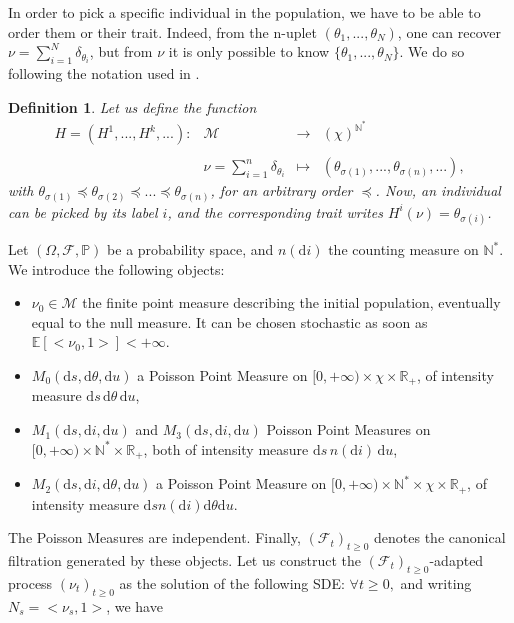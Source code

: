 \documentclass[a4paper,11pt]{article}
\newtheorem{defi}[theo]{Definition}
\newcommand{\itemb}{\item[$\bullet$]}
\newcommand{\dx}{\textrm{d}}
\begin{document}
In order to pick a specific individual in the population, we have to be able to order them or their trait. Indeed, from the n-uplet $(\theta_1,...,\theta_N)$, one can recover $\nu = \sum_{i=1}^N \delta_{\theta_i}$, but from $\nu$ it is only possible to know $\{\theta_1,...,\theta_N\}$. We do so following the notation used in \cite{fournier_microscopic_2004}.


\begin{defi}\label{notation}
Let us define the function 
\begin{displaymath}
\begin{array}{lccl}
H=(H^{1},...,H^{k},...) : & \mathcal{M} & \longrightarrow & \left(\chi\right)^{\mathbb{N}^{*}} \\
&&&\\
    &\displaystyle \nu = \sum_{i=1}^{n} \delta_{\theta_{i}} & \longmapsto & (\theta_{\sigma(1)},...,\theta_{\sigma(n)},... ), 
\end{array}
\end{displaymath}
with $\theta_{\sigma(1)} \preceq \theta_{\sigma(2)}\preceq ... \preceq \theta_{\sigma(n)}$, for an arbitrary order $\preceq$. 
Now, an individual can be picked by its label $i$, and the corresponding trait writes $H^{i}(\nu) = \theta_{\sigma(i)}$.
\end{defi}

Let $(\Omega,\mathcal{F},\mathbb{P})$ be a probability space, and $n(\dx i)$ the counting measure on $\mathbb{N}^*$. We introduce the following objects: 

\begin{itemize}\label{objets_proba}
\itemb $\nu_0\in \mathcal{M}$ the finite point measure describing the initial population, eventually equal to the null measure. It can be chosen stochastic as soon as $\mathbb{E}[<\nu_0,1>]<+\infty$.
\itemb $M_0(\dx s,\dx\theta,\dx u)$ a Poisson Point Measure on $[0,+\infty) \times \chi \times \mathbb{R}_+$, of intensity measure $\dx s \,\dx\theta\, \dx u$,
\itemb $M_1(\dx s,\dx i,\dx u)$ and $M_3(\dx s,\dx i,\dx u)$ Poisson Point Measures on $[0,+\infty) \times \mathbb{N}^* \times \mathbb{R}_+$, both of intensity measure $\dx s\, n(\dx i) \,\dx u$,
\itemb $M_2(\dx s,\dx i,\dx\theta,\dx u)$ a Poisson Point Measure on $[0,+\infty) \times \mathbb{N}^* \times \chi \times \mathbb{R}_+$, of intensity measure $\dx s n(\dx i) \dx\theta \dx u$.
\end{itemize}
The Poisson Measures are independent. Finally, $(\mathcal{F}_t)_{t\geq 0}$ denotes the canonical filtration generated by these objects. Let us construct the  $(\mathcal{F}_t)_{t\geq 0}$-adapted process $(\nu_t)_{t\geq 0}$ as the solution of the following SDE: $\forall t\geq 0,$ and writing $N_s = <\nu_s,1>$, we have
\end{document}

